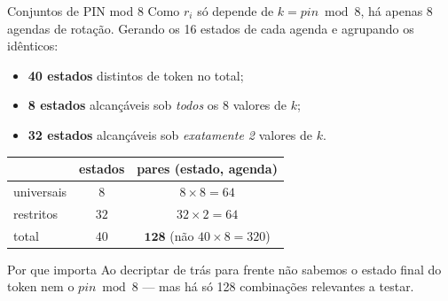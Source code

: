 \documentclass[aspectratio=169]{beamer}
\begin{document}
\begin{frame}{Conjuntos de PIN mod 8}
  Como $r_i$ só depende de $k = pin \bmod 8$, há apenas \alert{8 agendas} de
  rotação. Gerando os 16 estados de cada agenda e agrupando os idênticos:
  \begin{itemize}
    \item \textbf{40 estados} distintos de token no total;
    \item \textbf{8 estados} alcançáveis sob \emph{todos} os 8 valores de $k$;
    \item \textbf{32 estados} alcançáveis sob \emph{exatamente 2} valores de $k$.
  \end{itemize}
  \begin{center}
    \begin{tabular}{@{}l c c@{}}
      & estados & pares (estado, agenda)\\
      \hline
      universais & $8$ & $8 \times 8 = 64$\\
      restritos  & $32$ & $32 \times 2 = 64$\\
      \hline
      total & $40$ & $\mathbf{128}$ \quad (não $40\times8=320$)
    \end{tabular}
  \end{center}
  \begin{block}{Por que importa}
    Ao decriptar de trás para frente não sabemos o estado final do token nem o
    $pin \bmod 8$ --- mas há só \alert{128} combinações relevantes a testar.
  \end{block}
\end{frame}
\end{document}
